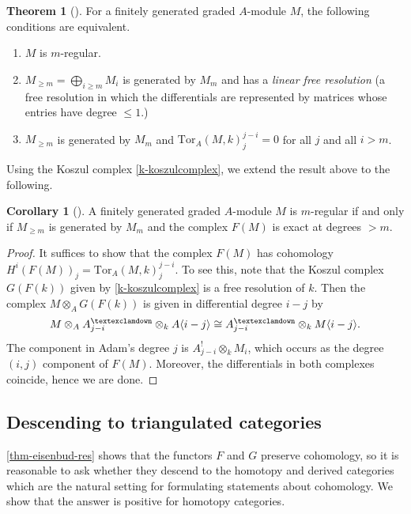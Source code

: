 \documentclass[a4paper]{article}
\theoremstyle{definition}
\newtheorem{theorem}[defn]{Theorem}
\newtheorem{cor}[defn]{Corollary}
\theoremstyle{remark}
\newcommand{\gnab}{{\textexclamdown}}
\begin{document}
\begin{theorem}[] For a finitely generated
    graded \(A\)-module \(M\), the following conditions are equivalent. 
    \begin{enumerate}
        \item \(M\) is \(m\)-regular.
        \item \(M_{\geq m} = \bigoplus_{i\geq m} M_i\) is generated by \(M_m\) and
            has a \textit{linear free resolution} (a free resolution in which
            the differentials are represented by matrices whose entries have
            degree \(\leq 1\).)
        \item \(M_{\geq m}\) is generated by \(M_m\) and
            \(\text{Tor}_A(M,k)^{j-i}_{j}=0\) for all \(j\) and all \(i>m\).
    \end{enumerate}
\end{theorem}

Using the Koszul complex \eqref{k-koszulcomplex}, we extend the result above to
the following. 

\begin{cor}[] \label{regularity-criterion} A
    finitely generated graded \(A\)-module \(M\) is \(m\)-regular if and only if
    \(M_{\geq m}\) is generated by \(M_m\) and the complex \(F(M)\) is exact at
    degrees \(>m\).
    \begin{proof}
        It suffices to show that the complex \(F(M)\) has cohomology \(H^i(F(M))_j=
        \text{Tor}_A(M,k)^{j-i}_{j}\). To see this, note that the Koszul complex
        \(G(F(k))\) given by \eqref{k-koszulcomplex} is a free resolution of
        \(k\). Then the complex \(M\otimes_A G(F(k))\) is given in differential
        degree \(i-j\) by 
        \[M\otimes_AA^\gnab_{j-i}\otimes_k A\langle i-j \rangle \cong
        A^\gnab_{j-i} \otimes_k M\langle i-j \rangle.\]
        The component in Adam's degree \(j\) is \(A^!_{j-i}\otimes_k M_i\),
        which occurs as the degree \((i,j)\) component of \(F(M)\). Moreover,
        the differentials in both complexes coincide, hence we are done.
    \end{proof}
\end{cor}

\subsection{Descending to triangulated categories}

\cref{thm-eisenbud-res} shows that the functors \(F\) and \(G\) preserve
cohomology, so it is reasonable to ask whether they descend to the
homotopy and derived categories which are the natural setting for
formulating statements about cohomology. We show that the answer is positive
for homotopy categories.
\end{document}
